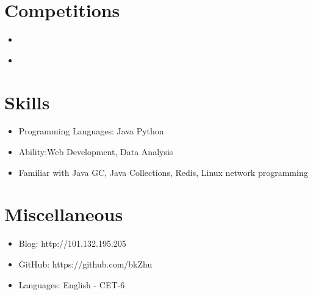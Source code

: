 \documentclass{resume}
\begin{document}

\section{Competitions}
\begin{itemize}[parsep=0.0ex]
\item{}
\end{itemize}

\begin{itemize}[parsep=0.0ex]
\item{}
\end{itemize}

\section{Skills}
\begin{itemize}[parsep=0.5ex]
  \item Programming Languages: Java  Python  
  \item Ability:Web Development, Data Analysis
  \item Familiar with Java GC, Java Collections, Redis, Linux network programming
\end{itemize}


\section{Miscellaneous}
\begin{itemize}[parsep=0.5ex]
  \item Blog: http://101.132.195.205
  \item GitHub: https://github.com/bkZhu
  \item Languages: English - CET-6
\end{itemize}

%
%
\newpage

\end{document}
